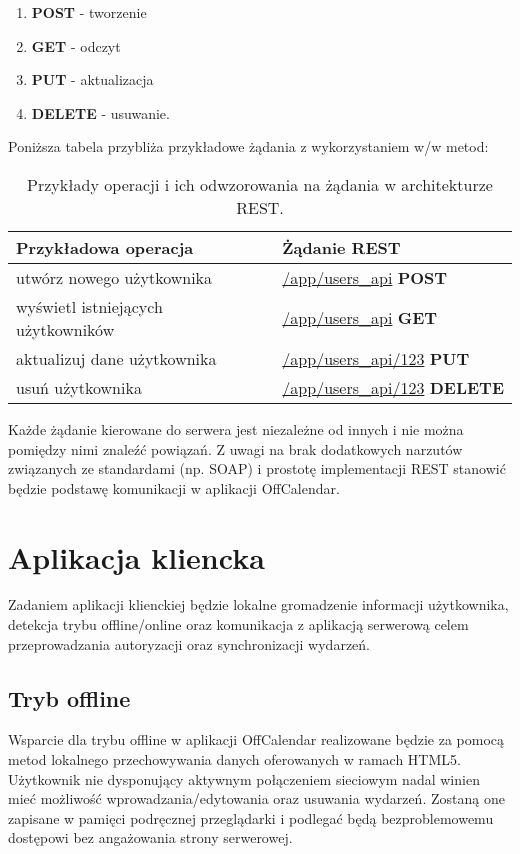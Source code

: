 \begin{enumerate}
\item\textbf{POST} - tworzenie
\item \textbf{GET} - odczyt
\item \textbf{PUT} - aktualizacja
\item \textbf{DELETE} - usuwanie.
\end{enumerate}

Poniższa tabela przybliża przykładowe żądania z wykorzystaniem w/w metod:

\begin{table}[h]
\centering
    \begin{tabular}{ | p{7cm} | p{7cm} | }
    \hline
    \textbf{Przykładowa operacja} & \textbf{Żądanie REST} \\ \hline
	utwórz nowego użytkownika & \url{/app/users_api} \textbf{POST}
	\\ \hline
	wyświetl istniejących użytkowników & \url{/app/users_api} \textbf{GET}
	\\ \hline
	aktualizuj dane użytkownika & \url{/app/users_api/123} \textbf{PUT}
	\\ \hline
	usuń użytkownika & \url{/app/users_api/123} \textbf{DELETE}
	\\ \hline
    \end{tabular}
	\caption{Przykłady operacji i ich odwzorowania na żądania w architekturze REST.}
\end{table}

Każde żądanie kierowane do serwera jest niezależne od innych i nie można pomiędzy nimi znaleźć powiązań. Z uwagi na brak dodatkowych narzutów związanych ze standardami (np. SOAP) i prostotę implementacji REST stanowić będzie podstawę komunikacji w aplikacji OffCalendar.

\section{Aplikacja kliencka}
\label{sec:appKliencka}

Zadaniem aplikacji klienckiej będzie lokalne gromadzenie informacji użytkownika, detekcja trybu offline/online oraz komunikacja z aplikacją serwerową celem przeprowadzania autoryzacji oraz synchronizacji wydarzeń.

\subsection{Tryb offline}
\label{trybOff}

Wsparcie dla trybu offline w aplikacji OffCalendar realizowane będzie za pomocą metod lokalnego przechowywania danych oferowanych w ramach HTML5. Użytkownik nie dysponujący aktywnym połączeniem sieciowym nadal winien mieć możliwość wprowadzania/edytowania oraz usuwania wydarzeń. Zostaną one zapisane w pamięci podręcznej przeglądarki i podlegać będą bezproblemowemu dostępowi bez angażowania strony serwerowej.

